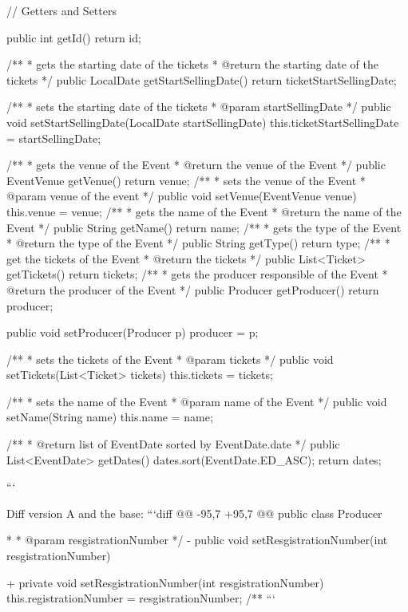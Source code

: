 \begin{prompt}
{    
    // Getters and Setters
    
    public int getId() {
      return id;
    }
    
    /**
     * gets the starting date of the tickets
     * @return the starting date of the tickets
     */
    public LocalDate getStartSellingDate() {
      return ticketStartSellingDate;
    }
  
    /**
     * sets the starting date of the tickets
     * @param startSellingDate
     */
    public void setStartSellingDate(LocalDate startSellingDate) {
      this.ticketStartSellingDate = startSellingDate;
    }
    
    /**
     * gets the venue of the Event
     * @return the venue of the Event
     */
    public EventVenue getVenue() {
      return venue;
    }
    /**
     * sets the venue of the Event
     * @param venue of the event
     */
    public void setVenue(EventVenue venue) {
      this.venue = venue;
    }
    /**
     * gets the name of the Event
     * @return the name of the Event
     */
    public String getName() {
      return name;
    }
    /**
     * gets the type of the Event
     * @return the type of the Event
     */
    public String getType() {
      return type;
    }
    /**
     * get the tickets of the Event
     * @return the tickets
     */
    public List<Ticket> getTickets() {
      return tickets;
    }
    /**
     * gets the producer responsible of the Event
     * @return the producer of the Event
     */
    public Producer getProducer() {
      return producer;
    }
  
    public void setProducer(Producer p){
      producer = p;
    }
    
    /**
     * sets the tickets of the Event
     * @param tickets
     */
    public void setTickets(List<Ticket> tickets) {
      this.tickets = tickets;
    }
    
    /**
     * sets the name of the Event
     * @param name of the Event
     */
    public void setName(String name) {
      this.name = name;
    }
  
    /**
     * @return list of EventDate sorted by EventDate.date
     */
    public List<EventDate> getDates() {
      dates.sort(EventDate.ED_ASC);
      return dates;
    }
  }
  ```
  
  Diff version A and the base:
  ```diff
  @@ -95,7 +95,7 @@ public class Producer {
           *
           * @param resgistrationNumber
           */
  -       public void setResgistrationNumber(int resgistrationNumber) {
  +       private void setResgistrationNumber(int resgistrationNumber) {
                  this.registrationNumber = resgistrationNumber;
          }
          /**
  ```
  
}}
\end{prompt}
